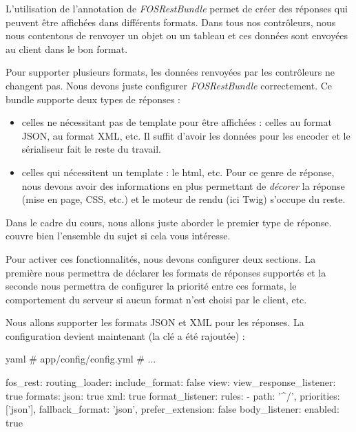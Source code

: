 \documentclass[big]{zmdocument}
\begin{document}
L'utilisation de l'annotation  de \textit{FOSRestBundle} permet de créer des réponses qui peuvent être affichées dans différents formats. Dans tous nos contrôleurs, nous nous contentons de renvoyer un objet ou un tableau et ces données sont envoyées au client dans le bon format.



Pour supporter plusieurs formats, les données renvoyées par les contrôleurs ne changent pas. Nous devons juste configurer \textit{FOSRestBundle} correctement.
Ce bundle supporte deux types de réponses :



\begin{itemize}
\item celles ne nécessitant pas de template pour être affichées : celles au format JSON, au format XML, etc. Il suffit d'avoir les données pour les encoder et le sérialiseur fait le reste du travail.
\item celles qui nécessitent un template : le html, etc. Pour ce genre de réponse, nous devons avoir des informations en plus permettant de \textit{décorer} la réponse (mise en page, CSS, etc.) et le moteur de rendu (ici Twig) s'occupe du reste.
\end{itemize}


Dans le cadre du cours, nous allons juste aborder le premier type de réponse.  couvre bien l'ensemble du sujet si cela vous intéresse.



Pour activer ces fonctionnalités, nous devons configurer deux sections. La première nous permettra de déclarer les formats de réponses supportés et la seconde nous permettra de configurer la priorité entre ces formats, le comportement du serveur si aucun format n'est choisi par le client, etc.



Nous allons supporter les formats JSON et XML pour les réponses. La configuration devient maintenant (la clé  a été rajoutée) :



\begin{CodeBlock}{yaml}
# app/config/config.yml
# ...

fos_rest:
    routing_loader:
        include_format: false
    view:
        view_response_listener: true
        formats:
            json: true
            xml: true
    format_listener:
        rules:
            - { path: '^/', priorities: ['json'], fallback_format: 'json', prefer_extension: false }
    body_listener:
        enabled: true
\end{CodeBlock}
\end{document}
